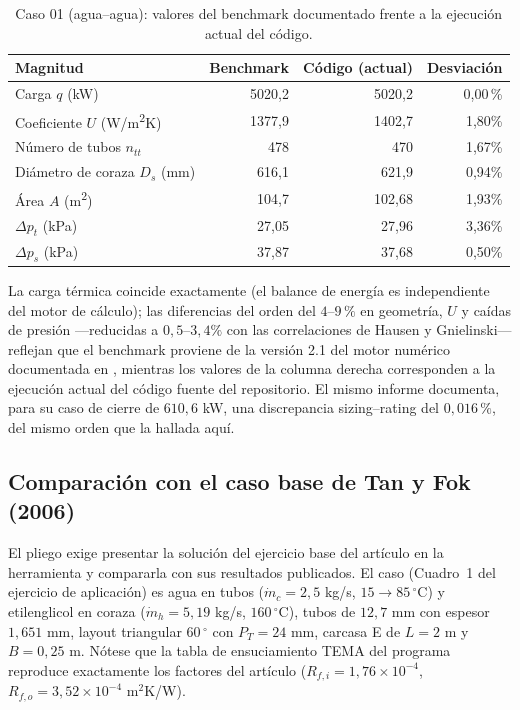 \documentclass[11pt,a4paper]{article}
\begin{document}
\begin{table}[htbp]
\centering
\caption{Caso 01 (agua--agua): valores del benchmark documentado \cite{reporte}
frente a la ejecuci\'on actual del c\'odigo.}
\label{tab:benchmark}
{\small
\begin{tabular}{@{}p{5.4cm}rrr@{}}
\toprule
\textbf{Magnitud} & \textbf{Benchmark} &
\textbf{C\'odigo (actual)} & \textbf{Desviaci\'on} \\
\midrule
Carga $q$ (kW)                     & 5020,2 & 5020,2  & 0{,}00\,\% \\
Coeficiente $U$ (W/m\textsuperscript{2}K) & 1377,9 & 1402,7  & 1{,}80\% \\
N\'umero de tubos $n_{tt}$          & 478    & 470     & 1{,}67\% \\
Di\'ametro de coraza $D_s$ (mm)     & 616,1  & 621,9   & 0{,}94\% \\
\'Area $A$ (m\textsuperscript{2})   & 104,7  & 102,68  & 1{,}93\% \\
$\Delta p_t$ (kPa)                 & 27,05  & 27,96   & 3{,}36\% \\
$\Delta p_s$ (kPa)                 & 37,87  & 37,68   & 0{,}50\% \\
\bottomrule
\end{tabular}}
\end{table}

La carga t\'ermica coincide exactamente (el balance de energ\'ia es independiente
del motor de c\'alculo); las diferencias del orden del $4$--$9\,\%$ en
geometr\'ia, $U$ y ca\'idas de presi\'on ---reducidas a $0{,}5$--$3{,}4\%$ con
las correlaciones de Hausen y Gnielinski--- reflejan que el benchmark proviene de la
versi\'on 2.1 del motor num\'erico documentada en \cite{reporte}, mientras los
valores de la columna derecha corresponden a la ejecuci\'on actual del c\'odigo
fuente del repositorio. El mismo informe \cite{reporte} documenta, para su caso
de cierre de $610{,}6$ kW, una discrepancia sizing--rating del $0{,}016\,\%$,
del mismo orden que la hallada aqu\'i.

\subsection{Comparaci\'on con el caso base de Tan y Fok (2006)}
\label{sec:tanfok}

El pliego exige presentar la soluci\'on del ejercicio base del art\'iculo
\cite{tanfok} en la herramienta y compararla con sus resultados publicados.
El caso (Cuadro~1 del ejercicio de aplicaci\'on) es agua en tubos
($\dot m_c = 2{,}5$ kg/s, $15 \rightarrow 85\,^\circ$C) y etilenglicol en coraza
($\dot m_h = 5{,}19$ kg/s, $160\,^\circ$C), tubos de $12{,}7$ mm con espesor
$1{,}651$ mm, layout triangular $60\,^\circ$ con $P_T = 24$ mm, carcasa E de
$L = 2$ m y $B = 0{,}25$ m. N\'otese que la tabla de ensuciamiento TEMA del
programa reproduce exactamente los factores del art\'iculo
($R_{f,i} = 1{,}76 \times 10^{-4}$, $R_{f,o} = 3{,}52 \times 10^{-4}$ m$^2$K/W).
\end{document}
